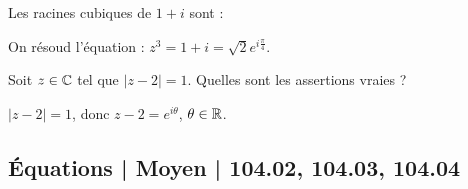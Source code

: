 \begin{question} 
Les racines cubiques de $1+i$ sont : 
\begin{answers}


\end{answers}
\begin{explanations}
On résoud l'équation  : $z^3=1+i= \sqrt 2e^{i\frac{\pi}{4}}$.

\end{explanations}

\end{question}





\begin{question} 
Soit $z\in \mathbb{C}$ tel que $|z-2|=1$.  Quelles sont les assertions vraies ?
\begin{answers}


\end{answers}
\begin{explanations}
$|z-2|=1$, donc $z-2=e^{i\theta}$, $\theta \in \mathbb{R}$.

\end{explanations}

\end{question}




\subsection{Équations | Moyen | 104.02, 104.03, 104.04}




